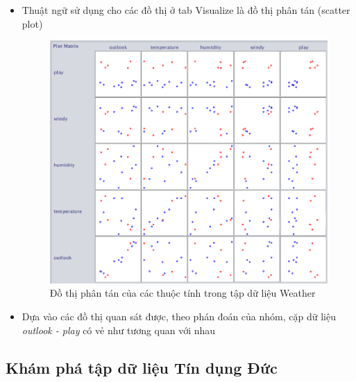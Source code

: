 \documentclass[a4paper, 12pt]{article}
\begin{document}
\begin{itemize}
    \item Thuật ngữ sử dụng cho các đồ thị ở tab Visualize là đồ thị phân tán (scatter plot)
    \begin{figure}[H]
        \begin{center}
            \includegraphics[scale = 0.5]{images/weatherScatterPlot.png}
            \caption{Đồ thị phân tán của các thuộc tính trong tập dữ liệu Weather}
        \end{center}
    \end{figure}

    \item Dựa vào các đồ thị quan sát được, theo phán đoán của nhóm, cặp dữ liệu \textit{outlook - play} có vẻ như tương quan với nhau
\end{itemize}

\subsection{Khám phá tập dữ liệu Tín dụng Đức}
\end{document}
